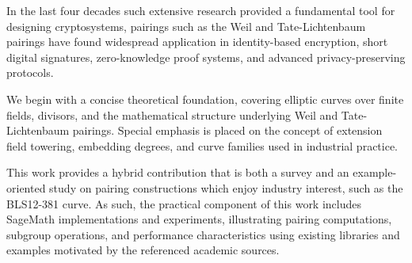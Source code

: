 In the last four decades such extensive research provided a fundamental tool for designing cryptosystems, 
pairings such as the Weil and Tate-Lichtenbaum pairings have found widespread application in identity-based encryption\cite{BF01}, short digital signatures, zero-knowledge proof systems\cite{bitansky2012extractable}, and advanced privacy-preserving protocols. 




We begin with a concise theoretical foundation, covering elliptic curves over finite fields, divisors, and the mathematical structure underlying Weil and Tate-Lichtenbaum pairings. Special emphasis is placed on the concept of extension field towering, embedding degrees, and curve families used in industrial practice. \cite{theory.pairings.for.beginners, Washington2008ECC, costello.fast.formulas.thesis}


This work provides a hybrid contribution that is both a survey and an example-oriented study on pairing constructions which enjoy industry interest, such as the BLS12-381 curve. As such, the practical component of this work includes SageMath \cite{tools.sagemath} implementations and experiments, illustrating pairing computations, subgroup operations, and performance characteristics using existing libraries and examples motivated by the referenced academic sources.

